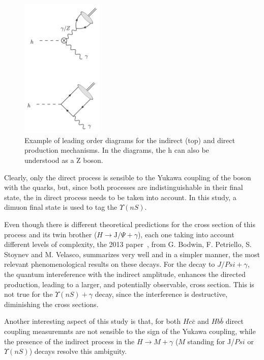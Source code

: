 \begin{figure}[!htbp]
  \begin{center}
  \includegraphics[width=0.35\textwidth ]{figures/theory/direct_indirect.png}
  \end{center}\vspace*{-.5cm}
  \caption{Example of leading order diagrams for the indirect (top) and direct production mechanisms. In the diagrams, the h can also be understood as a Z boson.}
  \label{direct_indirect}
  \end{figure}

Clearly, only the direct process is sensible to the Yukawa coupling of the boson with the quarks, but, since both processes are indistinguishable in their final state, the in direct process needs to be taken into account. In this study, a dimuon final state is used to tag the $\Upsilon(nS)$.

Even though there is different theoretical predictions for the cross section of this process and its twin brother ($H \rightarrow \text{J/}\Psi + \gamma$), each one taking into account different levels of complexity, the 2013 paper~\cite{PhysRevD.88.053003}, from G. Bodwin, F. Petriello, S. Stoynev and M. Velasco, summarizes very well and in a simpler manner, the most relevant phenomenological results on these decays. For the decay to $J/Psi + \gamma$, the quantum intereference with the indirect amplitude, enhances the directed production, leading to a larger, and potentially observable, cross section. This is not true for the $\Upsilon(nS) + \gamma$ decay, since the interference is destructive, diminishing the cross sections.

Another interesting aspect of this study is that, for both $Hc\bar{c}$ and $Hb\bar{b}$ direct coupling measuremnts are not sensible to the sign of the Yukawa coupling, while the presence of the indirect process in the $H \rightarrow M + \gamma$ ($M$ standing for J/$Psi$ or $\Upsilon(nS)$) decays resolve this ambiguity.

